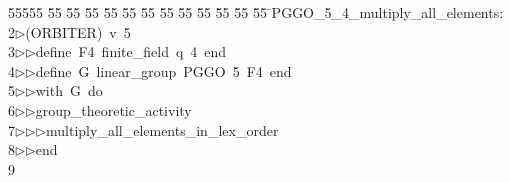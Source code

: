 %
%
\begin{tabbing}
55555 \= 55 \= 55 \= 55 \= 55 \= 55 \= 55 \= 55 \= 55 \= 55 \= 55 \= 55 \= 55 \= \>PGGO\_5\_4\_multiply\_all\_elements:\\[0pt]
2\>$\triangleright$\>(ORBITER)\ v\ 5\ \\[0pt]
3\>$\triangleright$\>$\triangleright$\>define\ F4\ finite\_field\ q\ 4\ end\ \\[0pt]
4\>$\triangleright$\>$\triangleright$\>define\ G\ linear\_group\ PGGO\ 5\ F4\ end\ \\[0pt]
5\>$\triangleright$\>$\triangleright$\>with\ G\ do\ \\[0pt]
6\>$\triangleright$\>$\triangleright$\>group\_theoretic\_activity\ \\[0pt]
7\>$\triangleright$\>$\triangleright$\>$\triangleright$\>multiply\_all\_elements\_in\_lex\_order\ \\[0pt]
8\>$\triangleright$\>$\triangleright$\>end\\[0pt]
9\>\end{tabbing}
